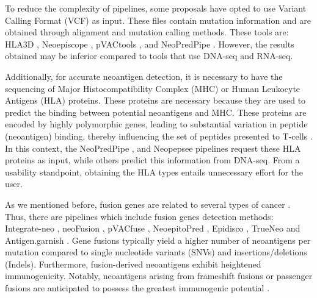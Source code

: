 To reduce the complexity of pipelines, some proposals have opted to use Variant Calling Format (VCF) as input. These files contain mutation information and are obtained through alignment and mutation calling methods. These tools are: HLA3D \cite{li2022hla3d}, Neoepiscope \cite{wood2020neoepiscope}, pVACtools \cite{hundal2020pvactools}, and NeoPredPipe \cite{schenck2019neopredpipe}. However, the results obtained may be inferior compared to tools that use DNA-seq and RNA-seq.

Additionally, for accurate neoantigen detection, it is necessary to have the sequencing of Major Histocompatibility Complex (MHC) or Human Leukocyte Antigens (HLA) proteins. These proteins are necessary because they are used to predict the binding between potential neoantigens and MHC. These proteins are encoded by highly polymorphic genes, leading to substantial variation in peptide (neoantigen) binding, thereby influencing the set of peptides presented to T-cells \cite{abualrous2021major}. In this context, the  NeoPredPipe \cite{schenck2019neopredpipe}, and Neopepsee \cite{kim2018neopepsee} pipelines request these HLA proteins as input, while others predict this information from DNA-seq. From a usability standpoint, obtaining the HLA types entails unnecessary effort for the user.

As we mentioned before, fusion genes are related to several types of cancer \cite{wood2020neoepiscope,wei2021re,yakushina2018gene,panicker2023exploring,lei2022eml4,zhang2022roles,panagopoulos2023novel}. Thus, there are pipelines which include fusion genes detection methods: Integrate-neo \cite{zhang2017integrate}, neoFusion \cite{wei2019landscape}, pVACfuse \cite{hundal2020pvactools}, NeoepitoPred \cite{chang2017neoepitope}, Epidisco \cite{rubinsteyn2018computational}, TrueNeo \cite{tang2020truneo} and Antigen.garnish \cite{rech2018tumor}. Gene fusions typically yield a higher number of neoantigens per mutation compared to single nucleotide variants (SNVs) and insertions/deletions (Indels). Furthermore, fusion-derived neoantigens exhibit heightened immunogenicity. Notably, neoantigens arising from frameshift fusions or passenger fusions are anticipated to possess the greatest immunogenic potential \cite{wang2021gene}. 



